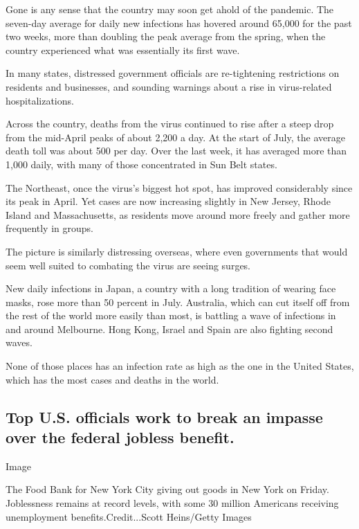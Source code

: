 Gone is any sense that the country may soon get ahold of the pandemic.
The seven-day average for daily new infections has hovered around 65,000
for the past two weeks, more than doubling the peak average from the
spring, when the country experienced what was essentially its first
wave.

In many states, distressed government officials are re-tightening
restrictions on residents and businesses, and sounding warnings about a
rise in virus-related hospitalizations.

Across the country, deaths from the virus continued to rise after a
steep drop from the mid-April peaks of about 2,200 a day. At the start
of July, the average death toll was about 500 per day. Over the last
week, it has averaged more than 1,000 daily, with many of those
concentrated in Sun Belt states.

The Northeast, once the virus's biggest hot spot, has improved
considerably since its peak in April. Yet cases are now increasing
slightly in New Jersey, Rhode Island and Massachusetts, as residents
move around more freely and gather more frequently in groups.

The picture is similarly distressing overseas, where even governments
that would seem well suited to combating the virus are seeing surges.

New daily infections in Japan, a country with a long tradition of
wearing face masks, rose more than 50 percent in July. Australia, which
can cut itself off from the rest of the world more easily than most, is
battling a wave of infections in and around Melbourne. Hong Kong, Israel
and Spain are also fighting second waves.

None of those places has an infection rate as high as the one in the
United States, which has the most cases and deaths in the world.

\hypertarget{top-us-officials-work-to-break-an-impasse-over-the-federal-jobless-benefit}{%
\subsection{Top U.S. officials work to break an impasse over the federal
jobless
benefit.}\label{top-us-officials-work-to-break-an-impasse-over-the-federal-jobless-benefit}}

Image

The Food Bank for New York City giving out goods in New York on Friday.
Joblessness remains at record levels, with some 30 million Americans
receiving unemployment benefits.Credit...Scott Heins/Getty Images

